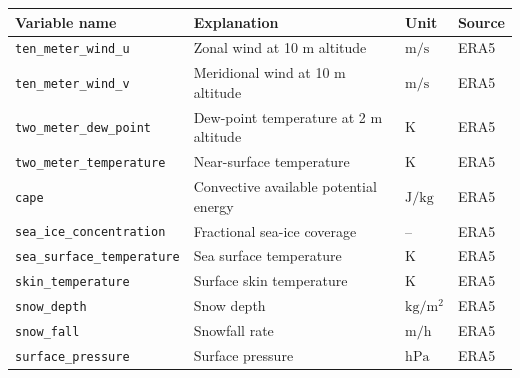 \documentclass[11pt]{article}
\begin{document}
\begin{table}[htbp]
	\centering
	\begin{tabular}{lp{4cm}ll}
		\toprule
		\textbf{Variable name}                       & \textbf{Explanation}                                   & \textbf{Unit}                               & \textbf{Source} \\
		\midrule
		\texttt{ten\_meter\_wind\_u}                 & Zonal wind at 10 m altitude                            & $\si{\meter \per \second}$                  & ERA5            \\
		\texttt{ten\_meter\_wind\_v}                 & Meridional wind at 10 m altitude                       & $\si{\meter \per \second}$                  & ERA5            \\
		\texttt{two\_meter\_dew\_point}              & Dew-point temperature at 2 m altitude                  & $\si{\kelvin}$                              & ERA5            \\
		\texttt{two\_meter\_temperature}             & Near-surface temperature                               & $\si{\kelvin}$                              & ERA5            \\
		\texttt{cape}                                & Convective available potential energy                  & $\si{\joule \per \kilo \gram}$              & ERA5            \\
		\texttt{sea\_ice\_concentration}             & Fractional sea-ice coverage                            & --                                          & ERA5            \\
		\texttt{sea\_surface\_temperature}           & Sea surface temperature                                & $\si{\kelvin}$                              & ERA5            \\
		\texttt{skin\_temperature}                   & Surface skin temperature                               & $\si{\kelvin}$                              & ERA5            \\
		\texttt{snow\_depth}                         & Snow depth                                             & $\si{\kilo \gram \per \meter \squared}$     & ERA5            \\
		\texttt{snow\_fall}                          & Snowfall rate                                          & $\si{\meter \per \hour}$                    & ERA5            \\
		\texttt{surface\_pressure}                   & Surface pressure                                       & $\si{\hecto \pascal}$                       & ERA5            \\

\end{tabular}
\end{table}
\end{document}
